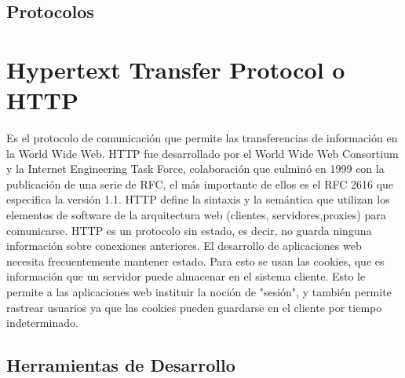 \documentclass[12pt, a4paper, twoside]{book}
\begin{document}
	\subsection{Protocolos}
	\section{Hypertext Transfer Protocol o HTTP}
	Es el protocolo de comunicación que permite las transferencias de información en la World Wide Web. HTTP fue desarrollado por el World Wide Web Consortium y la Internet Engineering Task Force, colaboración que culminó en 1999 con la publicación de una serie de RFC, el más importante de ellos es el RFC 2616 que especifica la versión 1.1. HTTP define la sintaxis y la semántica que utilizan los elementos de software de la arquitectura web (clientes, servidores,proxies) para comunicarse. HTTP es un protocolo sin estado, es decir, no guarda ninguna información sobre conexiones anteriores. El desarrollo de aplicaciones web necesita frecuentemente mantener estado. Para esto se usan las cookies, que es información que un servidor puede almacenar en el sistema cliente. Esto le permite a las aplicaciones web instituir la noción de "sesión", y también permite rastrear usuarios ya que las cookies pueden guardarse en el cliente por tiempo indeterminado.
	\subsection{Herramientas de Desarrollo}
\end{document}
